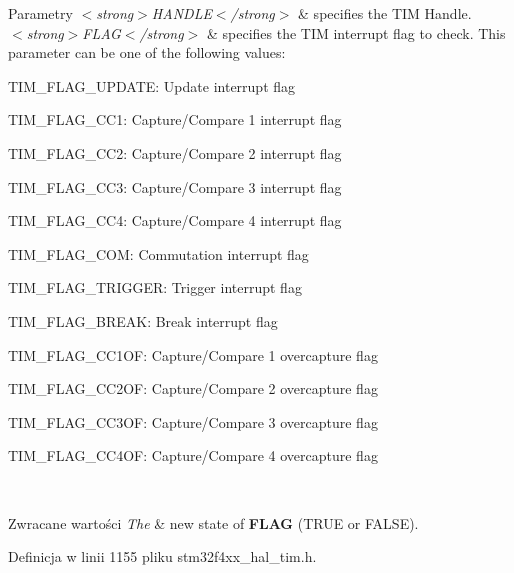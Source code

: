 \begin{DoxyParams}{Parametry}
{\em $<$strong$>$\+H\+A\+N\+D\+L\+E$<$/strong$>$} & specifies the T\+IM Handle. \\
\hline
{\em $<$strong$>$\+F\+L\+A\+G$<$/strong$>$} & specifies the T\+IM interrupt flag to check. This parameter can be one of the following values\+: \begin{DoxyItemize}
\item T\+I\+M\+\_\+\+F\+L\+A\+G\+\_\+\+U\+P\+D\+A\+TE\+: Update interrupt flag \item T\+I\+M\+\_\+\+F\+L\+A\+G\+\_\+\+C\+C1\+: Capture/\+Compare 1 interrupt flag \item T\+I\+M\+\_\+\+F\+L\+A\+G\+\_\+\+C\+C2\+: Capture/\+Compare 2 interrupt flag \item T\+I\+M\+\_\+\+F\+L\+A\+G\+\_\+\+C\+C3\+: Capture/\+Compare 3 interrupt flag \item T\+I\+M\+\_\+\+F\+L\+A\+G\+\_\+\+C\+C4\+: Capture/\+Compare 4 interrupt flag \item T\+I\+M\+\_\+\+F\+L\+A\+G\+\_\+\+C\+OM\+: Commutation interrupt flag \item T\+I\+M\+\_\+\+F\+L\+A\+G\+\_\+\+T\+R\+I\+G\+G\+ER\+: Trigger interrupt flag \item T\+I\+M\+\_\+\+F\+L\+A\+G\+\_\+\+B\+R\+E\+AK\+: Break interrupt flag \item T\+I\+M\+\_\+\+F\+L\+A\+G\+\_\+\+C\+C1\+OF\+: Capture/\+Compare 1 overcapture flag \item T\+I\+M\+\_\+\+F\+L\+A\+G\+\_\+\+C\+C2\+OF\+: Capture/\+Compare 2 overcapture flag \item T\+I\+M\+\_\+\+F\+L\+A\+G\+\_\+\+C\+C3\+OF\+: Capture/\+Compare 3 overcapture flag \item T\+I\+M\+\_\+\+F\+L\+A\+G\+\_\+\+C\+C4\+OF\+: Capture/\+Compare 4 overcapture flag \end{DoxyItemize}
\\
\hline
\end{DoxyParams}

\begin{DoxyRetVals}{Zwracane wartości}
{\em The} & new state of {\bfseries F\+L\+AG} (T\+R\+UE or F\+A\+L\+SE). \\
\hline
\end{DoxyRetVals}


Definicja w linii 1155 pliku stm32f4xx\+\_\+hal\+\_\+tim.\+h.

\mbox{\label{group___t_i_m___exported___macros_gabfeec6b3c67a5747c7dbd20aff61d8e2}} 
